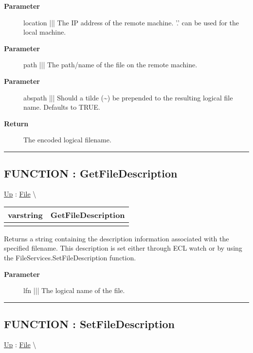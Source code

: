 \par
\begin{description}
\item [\textbf{Parameter}] location ||| The IP address of the remote machine. '.' can be used for the local machine.
\item [\textbf{Parameter}] path ||| The path/name of the file on the remote machine.
\item [\textbf{Parameter}] abspath ||| Should a tilde (\~{}) be prepended to the resulting logical file name. Defaults to TRUE.
\item [\textbf{Return}] The encoded logical filename.
\end{description}

\rule{\linewidth}{0.5pt}
\subsection*{FUNCTION : GetFileDescription}
\hypertarget{ecldoc:file.getfiledescription}{}
\hyperlink{ecldoc:File}{Up} :
\hspace{0pt} \hyperlink{ecldoc:File}{File} \textbackslash 

{\renewcommand{\arraystretch}{1.5}
\begin{tabularx}{\textwidth}{|>{\raggedright\arraybackslash}l|X|}
\hline
\hspace{0pt}varstring & GetFileDescription \\
\hline
\multicolumn{2}{|>{\raggedright\arraybackslash}X|}{\hspace{0pt}(varstring lfn)} \\
\hline
\end{tabularx}
}

\par
Returns a string containing the description information associated with the specified filename. This description is set either through ECL watch or by using the FileServices.SetFileDescription function.

\par
\begin{description}
\item [\textbf{Parameter}] lfn ||| The logical name of the file.
\end{description}

\rule{\linewidth}{0.5pt}
\subsection*{FUNCTION : SetFileDescription}
\hypertarget{ecldoc:file.setfiledescription}{}
\hyperlink{ecldoc:File}{Up} :
\hspace{0pt} \hyperlink{ecldoc:File}{File} \textbackslash 


